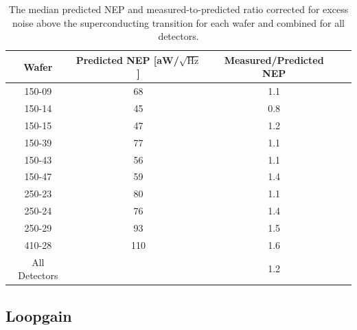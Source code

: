 \begin{table}[ht!]
\begin{center}
\begin{tabular}{|c|c|c|c|}
\hline  Wafer & Predicted NEP [aW/$\sqrt{\mathrm{Hz}}$] & Measured/Predicted NEP \\
\hline 150-09 & 68 & 1.1 \\
\hline 150-14 & 45 & 0.8 \\
\hline 150-15 & 47 & 1.2 \\
\hline 150-39 & 77 & 1.1 \\
\hline 150-43 & 56 & 1.1 \\
\hline 150-47 & 59 & 1.4 \\
\hline 250-23 & 80 & 1.1 \\
\hline 250-24 & 76 & 1.4 \\
\hline 250-29 & 93 & 1.5 \\
\hline 
410-28 & 110 & 1.6 \\
\hline
All Detectors &  & 1.2 \\
\hline
\end{tabular}
\end{center}
\caption{The median predicted \ac{NEP} and measured-to-predicted ratio corrected for excess noise above the superconducting transition for each wafer and combined for 
all detectors.
}
\label{tab:in_transition_noise_table}
\end{table}






\subsection{Loopgain}
\label{sec:loopgain}

